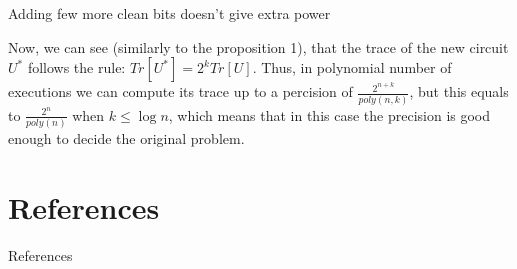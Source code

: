 \documentclass[leqno,fleqn]{beamer}
\begin{document}
\begin{frame}[label=sec-3-4]{Adding few more clean bits doesn't give extra power}

Now, we can see (similarly to the proposition 1), that the trace of the new circuit \(U^*\) follows the rule: \(Tr[U^{*}] = 2^{k}Tr[U]\). Thus, in polynomial number of executions we can compute its trace up to a percision of \(\frac{2^{n+k}}{poly(n,k)}\), but this equals to \(\frac{2^{n}}{poly(n)}\) when \(k  \leq \log{n}\), which means that in this case the precision is good enough to decide the original problem.
\end{frame}

\section{References}
\label{sec-4}
\begin{frame}[label=sec-4-1]{References}


\end{frame}
\end{document}
